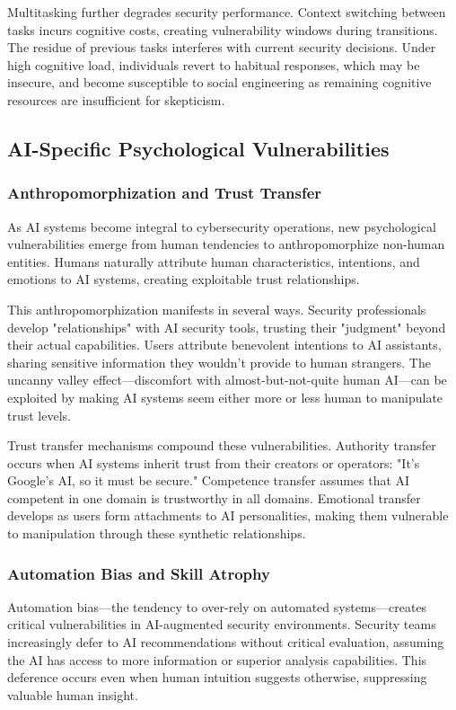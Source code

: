 \documentclass[11pt,a4paper]{article}
\begin{document}
Multitasking further degrades security performance. Context switching between tasks incurs cognitive costs, creating vulnerability windows during transitions. The residue of previous tasks interferes with current security decisions. Under high cognitive load, individuals revert to habitual responses, which may be insecure, and become susceptible to social engineering as remaining cognitive resources are insufficient for skepticism.

\subsection{AI-Specific Psychological Vulnerabilities}

\subsubsection{Anthropomorphization and Trust Transfer}

As AI systems become integral to cybersecurity operations, new psychological vulnerabilities emerge from human tendencies to anthropomorphize non-human entities. Humans naturally attribute human characteristics, intentions, and emotions to AI systems, creating exploitable trust relationships.

This anthropomorphization manifests in several ways. Security professionals develop "relationships" with AI security tools, trusting their "judgment" beyond their actual capabilities. Users attribute benevolent intentions to AI assistants, sharing sensitive information they wouldn't provide to human strangers. The uncanny valley effect—discomfort with almost-but-not-quite human AI—can be exploited by making AI systems seem either more or less human to manipulate trust levels.

Trust transfer mechanisms compound these vulnerabilities. Authority transfer occurs when AI systems inherit trust from their creators or operators: "It's Google's AI, so it must be secure." Competence transfer assumes that AI competent in one domain is trustworthy in all domains. Emotional transfer develops as users form attachments to AI personalities, making them vulnerable to manipulation through these synthetic relationships.

\subsubsection{Automation Bias and Skill Atrophy}

Automation bias—the tendency to over-rely on automated systems—creates critical vulnerabilities in AI-augmented security environments. Security teams increasingly defer to AI recommendations without critical evaluation, assuming the AI has access to more information or superior analysis capabilities. This deference occurs even when human intuition suggests otherwise, suppressing valuable human insight.
\end{document}
